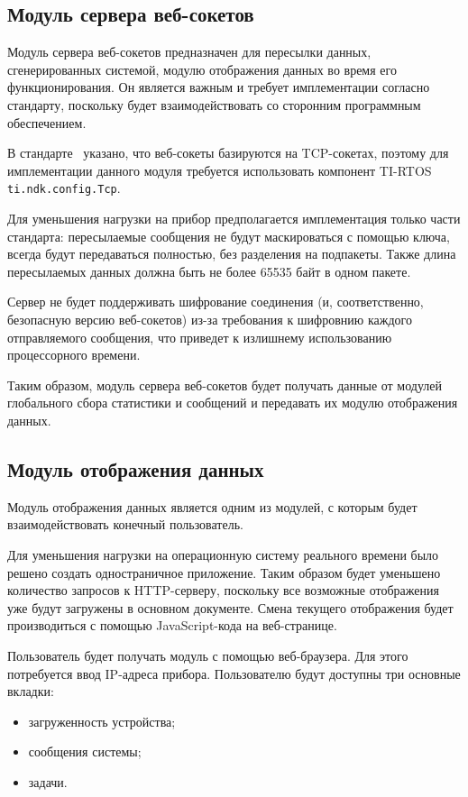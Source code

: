\subsection{Модуль сервера веб-сокетов}

Модуль сервера веб-сокетов предназначен для пересылки данных, сгенерированных
системой, модулю отображения данных во время его функционирования. Он является
важным и требует имплементации согласно стандарту, поскольку будет
взаимодействовать со сторонним программным обеспечением.

В стандарте~\cite{websock_rfc} указано, что веб-сокеты базируются на TCP-сокетах,
поэтому для имплементации данного модуля требуется использовать компонент TI-RTOS
\texttt{ti.ndk.config.Tcp}.

Для уменьшения нагрузки на прибор предполагается имплементация только части
стандарта: пересылаемые сообщения не будут маскироваться с помощью ключа,
всегда будут передаваться полностью, без разделения на подпакеты. Также
длина пересылаемых данных должна быть не более 65535 байт в одном пакете.

Сервер не будет поддерживать шифрование соединения (и, соответственно,
безопасную версию веб-сокетов) из-за требования к шифровнию каждого
отправляемого сообщения, что приведет к излишнему использованию процессорного
времени.

Таким образом, модуль сервера веб-сокетов будет получать данные от модулей
глобального сбора статистики и сообщений и передавать их модулю отображения
данных.

\subsection{Модуль отображения данных}

Модуль отображения данных является одним из модулей, с которым будет
взаимодействовать конечный пользователь.

Для уменьшения нагрузки на операционную систему реального времени было решено
создать одностраничное приложение. Таким образом будет уменьшено количество
запросов к HTTP-серверу, поскольку все возможные отображения уже будут загружены
в основном документе. Смена текущего отображения будет производиться с помощью
JavaScript-кода на веб-странице.

Пользователь будет получать модуль с помощью веб-браузера. Для этого потребуется
ввод IP-адреса прибора. Пользователю будут доступны три основные вкладки:
\begin{itemize}
    \item загруженность устройства;
    \item сообщения системы;
    \item задачи.
\end{itemize}

